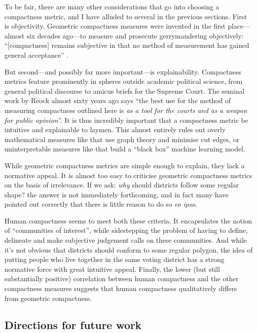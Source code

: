 \documentclass[]{article}
\begin{document}
To be fair, there are many other considerations that go into choosing a
compactness metric, and I have alluded to several in the previous
sections. First is objectivity. Geometric compactness measures were
invented in the first place---almost six decades ago---to measure and
prosecute gerrymandering objectively: ``{[}compactness{]} remains
subjective in that no method of measurement has gained general
acceptance'' \citep[p.~74]{reock1961}.

But second---and possibly far more important---is explainability.
Compactness metrics feature prominently in spheres outside academic
political science, from general political discourse to amicus briefs for
the Supreme Court. The seminal work by Reock almost sixty years ago says
``the best use for the method of measuring compactness outlined here is
\emph{as a tool for the courts and as a weapon for public opinion}''. It
is thus incredibly important that a compactness metric be intuitive and
explainable to laymen. This almost entirely rules out overly
mathematical measures like \cite{dc2016} that use graph theory and
minimise cut edges, or uninterpretable measures like \cite{kingwp} that
build a ``black box'' machine learning model.

While geometric compactness metrics are simple enough to explain, they
lack a normative appeal. It is almost too easy to criticise geometric
compactness metrics on the basis of irrelevance. If we ask: \emph{why}
should districts follow some regular shape? the answer is not
immediately forthcoming, and in fact many have pointed out correctly
that there is little reason to do so \emph{eo ipso}.

Human compactness seems to meet both these criteria. It encapsulates the
notion of ``communities of interest'', while sidestepping the problem of
having to define, delineate and make subjective judgement calls on these
communities. And while it's not obvious that districts should conform to
some regular polygon, the idea of putting people who live together in
the same voting district has a strong normative force with great
intuitive appeal. Finally, the lower (but still substantially positive)
correlation between human compactness and the other compactness measures
suggests that human compactness qualitatively differs from geometric
compactness.

\hypertarget{directions-for-future-work}{%
\subsection{Directions for future
work}\label{directions-for-future-work}}
\end{document}
